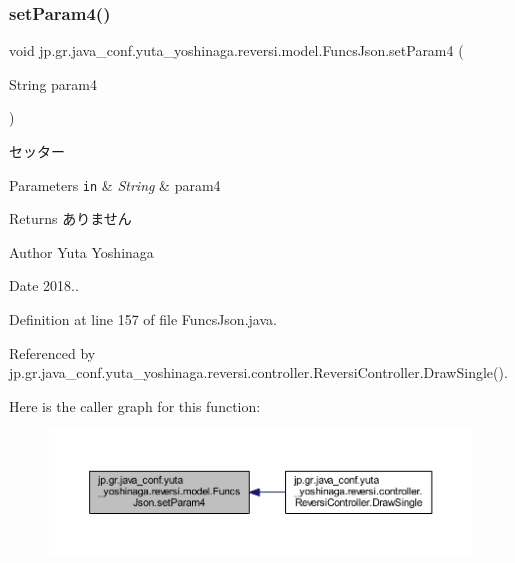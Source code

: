 \subsubsection{\texorpdfstring{set\+Param4()}{setParam4()}}
{\footnotesize\ttfamily void jp.\+gr.\+java\+\_\+conf.\+yuta\+\_\+yoshinaga.\+reversi.\+model.\+Funcs\+Json.\+set\+Param4 (\begin{DoxyParamCaption}\item[{String}]{param4 }\end{DoxyParamCaption})}



セッター 


\begin{DoxyParams}[1]{Parameters}
\mbox{\tt in}  & {\em String} & param4 \\
\hline
\end{DoxyParams}
\begin{DoxyReturn}{Returns}
ありません 
\end{DoxyReturn}
\begin{DoxyAuthor}{Author}
Yuta Yoshinaga 
\end{DoxyAuthor}
\begin{DoxyDate}{Date}
2018.. 
\end{DoxyDate}


Definition at line 157 of file Funcs\+Json.\+java.



Referenced by jp.\+gr.\+java\+\_\+conf.\+yuta\+\_\+yoshinaga.\+reversi.\+controller.\+Reversi\+Controller.\+Draw\+Single().

Here is the caller graph for this function\+:
\nopagebreak
\begin{figure}[H]
\begin{center}
\leavevmode
\includegraphics[width=350pt]{classjp_1_1gr_1_1java__conf_1_1yuta__yoshinaga_1_1reversi_1_1model_1_1_funcs_json_a44af51970635551127a296e3c07db7ec_icgraph}
\end{center}
\end{figure}
\mbox{\label{classjp_1_1gr_1_1java__conf_1_1yuta__yoshinaga_1_1reversi_1_1model_1_1_funcs_json_a020f9dc27e5d795a0554ee1fda117797}} 
